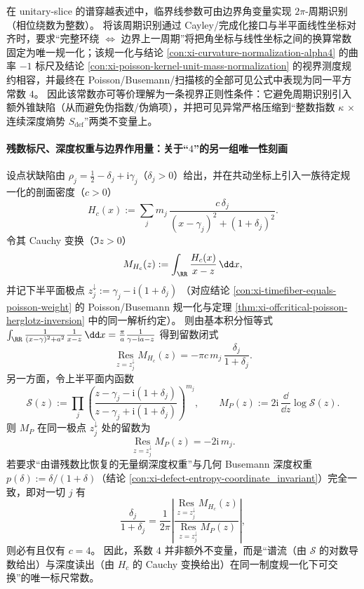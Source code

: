 \begin{proposition}\label{con:xi-four_as_horizon_regularization_no_cone}
在 unitary-slice 的谱穿越表述中，临界线参数可由边界角变量实现 \(2\pi\)-周期识别（相位绕数为整数）。
将该周期识别通过 Cayley/完成化接口与半平面线性坐标对齐时，要求“完整环绕 \(\Longleftrightarrow\) 边界上一周期”将把角坐标与线性坐标之间的换算常数固定为唯一规一化；该规一化与结论 \ref{con:xi-curvature-normalization-alpha4} 的曲率 \(-1\) 标尺及结论 \ref{con:xi-poisson-kernel-unit-mass-normalization} 的视界测度规约相容，并最终在 Poisson/Busemann/扫描核的全部可见公式中表现为同一平方常数 \(4\)。
因此该常数亦可等价理解为一条视界正则性条件：它避免周期识别引入额外锥缺陷（从而避免伪指数/伪熵项），并把可见异常严格压缩到“整数指数 \(\kappa\) \(\times\) 连续深度熵势 \(S_{\mathrm{def}}\)”两类不变量上。
\end{proposition}

\paragraph{残数标尺、深度权重与边界作用量：关于“\texorpdfstring{$4$}{4}”的另一组唯一性刻画}

\begin{proposition}
设点状缺陷由 \(\rho_j=\tfrac12-\delta_j+\mathrm{i}\gamma_j\)（\(\delta_j>0\)）给出，并在共动坐标上引入一族待定规一化的剖面密度（\(c>0\)）
\[
H_{c}(x):=\sum_{j} m_j\,\frac{c\,\delta_j}{(x-\gamma_j)^2+(1+\delta_j)^2}.
\]
令其 Cauchy 变换（\(\Im z>0\)）
\[
M_{H_c}(z):=\int_{\RR}\frac{H_c(x)}{x-z}\,\dd x,
\]
并记下半平面极点
\(
z_j^{\downarrow}:=\gamma_j-\mathrm{i}(1+\delta_j)
 \)
（对应结论 \ref{con:xi-timefiber-equals-poisson-weight} 的 Poisson/Busemann 规一化与定理 \ref{thm:xi-offcritical-poisson-herglotz-inversion} 中的同一解析约定）。
则由基本积分恒等式
\(
\int_{\RR}\frac{1}{(x-\gamma)^2+a^2}\frac{1}{x-z}\,\dd x=\frac{\pi}{a}\frac{1}{\gamma-\mathrm{i}a-z}
 \)
得到留数闭式
\[
\operatorname*{Res}_{z=z_j^{\downarrow}}M_{H_c}(z)
=-\pi c\,m_j\,\frac{\delta_j}{1+\delta_j}.
\]
另一方面，令上半平面内函数
\[
\mathcal{S}(z):=\prod_{j}\left(\frac{z-\gamma_j-\mathrm{i}(1+\delta_j)}{z-\gamma_j+\mathrm{i}(1+\delta_j)}\right)^{m_j},
\qquad
M_{P}(z):=2\mathrm{i}\,\frac{\dd}{\dd z}\log\mathcal{S}(z).
\]
则 \(M_{P}\) 在同一极点 \(z_j^{\downarrow}\) 处的留数为
\[
\operatorname*{Res}_{z=z_j^{\downarrow}}M_{P}(z)=-2\mathrm{i}\,m_j.
\]
若要求“由谱残数比恢复的无量纲深度权重”与几何 Busemann 深度权重 \(p(\delta):=\delta/(1+\delta)\)（结论 \ref{con:xi-defect-entropy-coordinate_invariant}）完全一致，即对一切 \(j\) 有
\[
\frac{\delta_j}{1+\delta_j}
=\frac{1}{2\pi}\left|\frac{\operatorname*{Res}_{z=z_j^{\downarrow}}M_{H_c}(z)}{\operatorname*{Res}_{z=z_j^{\downarrow}}M_{P}(z)}\right|,
\]
则必有且仅有 \(c=4\)。
因此，系数 \(4\) 并非额外不变量，而是“谱流（由 \(\mathcal{S}\) 的对数导数给出）与深度读出（由 \(H_c\) 的 Cauchy 变换给出）在同一制度规一化下可交换”的唯一标尺常数。
\end{proposition}

